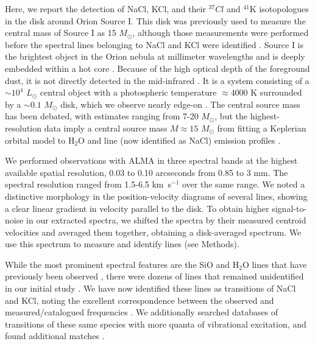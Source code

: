 \documentclass[12pt]{article}
\newcommand{\msun}{\ensuremath{M_{\odot}}\xspace}			%
\newcommand{\lsun}{\ensuremath{L_{\odot}}\xspace}			%
\newcommand{\water}{H$_{2}$O\xspace}		%
\newcommand{\kms}{\textrm{km~s}\ensuremath{^{-1}}\xspace}	%
\begin{document}
Here, we report the detection of NaCl, KCl, and their $^{37}Cl$ and $^{41}$K
isotopologues in the disk around Orion Source I.  This disk was previously used
to measure the central mass of Source I as 15 \msun, although those
measurements were performed before the spectral lines belonging to NaCl and KCl
were identified \cite{Ginsburg2018b}.  Source I is the brightest object in the
Orion nebula at millimeter wavelengths and is deeply embedded within a hot core
\cite{}. Because of the high optical depth of the foreground dust, it is not
directly detected in the
mid-infrared \cite[e.g.,][]{Robberto2005a}. It is a system consisting of a
$\sim10^4$ \lsun central object with a photospheric temperature $\approx4000$ K
\cite{Testi2010a} surrounded by a $\sim0.1$ \msun disk, which we observe
nearly edge-on \cite{Plambeck2016a}.  The central source mass has been
debated, with estimates ranging from 7-20 \msun \cite{Matthews2010a,other},
but the highest-resolution data imply a central source mass $M\approx15$ \msun
from fitting a Keplerian orbital model to \water and line (now identified as
NaCl) emission profiles \cite{Ginsburg2018b}.

We performed observations with ALMA in three spectral bands at the highest
available spatial resolution, 0.03 to 0.10 arcseconds from 0.85 to 3 mm. The
spectral resolution ranged from 1.5-6.5 \kms over the same range.  We noted a
distinctive morphology in the position-velocity diagrams of several lines,
showing a clear linear gradient in velocity parallel to the disk. To obtain
higher signal-to-noise in our extracted spectra, we shifted the spectra by
their measured centroid velocities and averaged them together, obtaining a
disk-averaged spectrum.  We use this spectrum to measure and  identify lines
(see Methods).

While the most prominent spectral features are the SiO and \water lines that
have previously been observed \cite{Goddi2013a,Hirota2014a}, there were dozens
of lines that remained unidentified in our initial study \cite{Ginsburg2018b}.
We have now identified these lines as transitions of NaCl and KCl, noting the
excellent correspondence between the observed and measured/catalogued
frequencies \cite{Caris2002a,Caris2004a,Muller2005a,Lovas2005a,Pickett1998a}.
We additionally searched databases of transitions of these same species with
more quanta of vibrational excitation, and found additional matches
\cite{Barton2014a,Cabezas2016a}.
\end{document}

